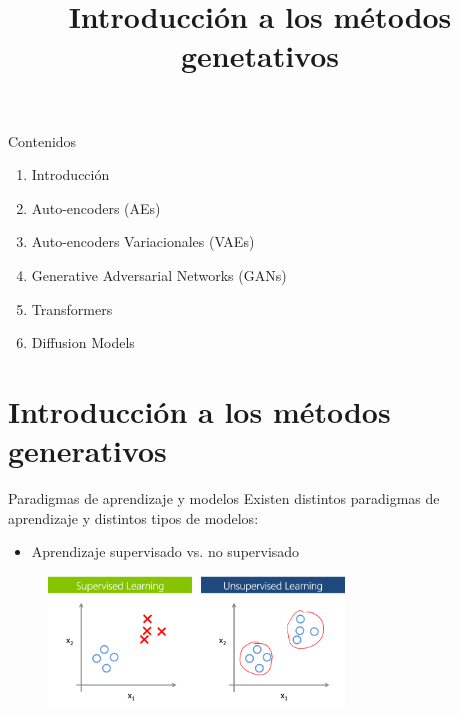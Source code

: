 



\title{Introducción a los métodos genetativos}


\maketitle

\begin{frame}{Contenidos}
  \begin{enumerate}
      \item Introducción
      \item Auto-encoders (AEs)
      \item{Auto-encoders Variacionales (VAEs)}
      \item{Generative Adversarial Networks (GANs)}
      \item{Transformers}
      \item{Diffusion Models}
    \end{enumerate}
\end{frame}

\section{Introducción a los métodos generativos}

\begin{frame}{Paradigmas de aprendizaje y modelos}
Existen distintos paradigmas de aprendizaje y distintos tipos de modelos:
\begin{itemize}
    \item Aprendizaje supervisado vs. no supervisado
\end{itemize}

\begin{figure}
    \centering
    \includegraphics[width=0.7\textwidth]{Slides/figures/02_Metodos_Generativos/2.1. sup vs no sup.png}
\end{figure}
\end{frame}


